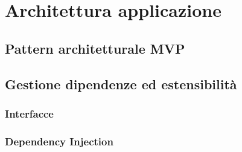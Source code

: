 \documentclass[../ManualeSviluppatore.tex]{subfiles}
\begin{document}
\section{Architettura applicazione}

	\subsection{Pattern architetturale MVP}
	
	
	\subsection{Gestione dipendenze ed estensibilità}
		
		\subsubsection{Interfacce}		
		
		\subsubsection{Dependency Injection}
		
		
\end{document}
